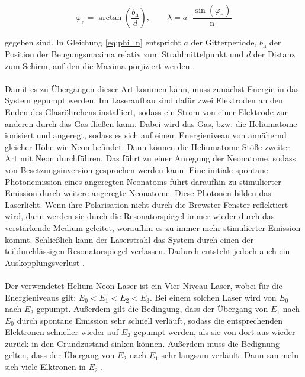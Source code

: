 \begin{equation}
    \varphi_{\text{n}}=\arctan{\left(\frac{b_{\text{n}}}{d}\right)},\qquad \lambda = a\cdot\frac{\sin{\left(\varphi_{\text{n}}\right)}}{\text{n}}
    \label{eq:phi_n}
\end{equation}

gegeben sind. In Gleichung \eqref{eq:phi_n} entspricht $a$ der Gitterperiode, $b_{\text{n}}$ der Position der Beugungsmaxima relativ zum Strahlmittelpunkt und 
$d$ der Distanz zum Schirm, auf den die Maxima porjiziert werden \cite{2}.\\\\
Damit es zu Übergängen dieser Art kommen kann, muss zunächst Energie in das 
System gepumpt werden.
Im Laseraufbau sind dafür zwei Elektroden an den Enden des Glasröhrchens installiert, 
sodass ein Strom von einer Elektrode zur anderen durch das Gas fließen kann.
Dabei wird das Gas, bzw. die Heliumatome ionisiert und angeregt,
sodass es sich auf einem Energieniveau von annähernd gleicher Höhe wie Neon befindet.
Dann können die Heliumatome Stöße zweiter Art mit Neon durchführen.
Das führt zu einer Anregung der Neonatome, sodass von Besetzungsinversion 
gesprochen werden kann. Eine initiale spontane Photonemission eines angeregten 
Neonatoms führt daraufhin zu stimulierter Emission durch weitere angeregte Neonatome. 
Diese Photonen bilden das Laserlicht. Wenn ihre Polarisation nicht durch die 
Brewster-Fenster reflektiert wird, dann werden sie durch die Resonatorspiegel 
immer wieder durch das verstärkende Medium geleitet, woraufhin es zu immer mehr
stimulierter Emission kommt. Schließlich kann der Laserstrahl das System durch einen 
der teildurchlässigen Resonatorspiegel verlassen. Dadurch entsteht jedoch auch ein 
Auskopplungsverlust \cite{2}.\\\\
Der verwendetet Helium-Neon-Laser ist ein Vier-Niveau-Laser, wobei für die 
Energieniveaus gilt: $E_{\text{0}} <E_{\text{1}} < E_{\text{2}} < E_{\text{3}}$.
Bei einem solchen Laser wird von $E_{\text{0}}$ nach $E_{\text{3}}$ gepumpt. 
Außerdem gilt die Bedingung, dass der Übergang von $E_{\text{1}}$ nach $E_{\text{0}}$
durch spontane Emission sehr schnell verläuft, sodass die entsprechenden 
Elektronen schneller wieder auf $E_{\text{3}}$ gepumpt werden, als sie von dort 
aus wieder zurück in den Grundzustand sinken können. Außerdem muss die 
Bedignung gelten, dass der Übergang von $E_{\text{2}}$ nach $E_{\text{1}}$
sehr langsam verläuft. Dann sammeln sich viele Elktronen in $E_{\text{2}}$ \cite{3}.

